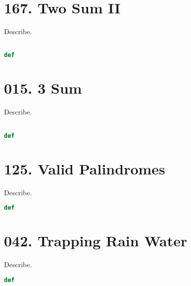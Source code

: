 \documentclass{article}
\begin{document}
\section{167. Two Sum II}
\begin{tcolorbox}[colback=red!5!white, colframe=red!50!black,title=167. Two Sum II ] 
Describe.
\end{tcolorbox}
\begin{lstlisting}[language=Python]

def 

\end{lstlisting}
\section{015. 3 Sum}
\begin{tcolorbox}[colback=red!5!white, colframe=red!50!black,title=015. 3 Sum ] 
Describe.
\end{tcolorbox}
\begin{lstlisting}[language=Python]

def 

\end{lstlisting}
\section{125. Valid Palindromes}
\begin{tcolorbox}[colback=red!5!white, colframe=red!50!black,title=125. Valid Palindromes ] 
Describe.
\end{tcolorbox}
\begin{lstlisting}[language=Python]
def 

\end{lstlisting}
\section{042. Trapping Rain Water}
\begin{tcolorbox}[colback=red!5!white, colframe=red!50!black,title=042. Trapping Rain Water ] 
Describe.
\end{tcolorbox}
\begin{lstlisting}[language=Python]
def 

\end{lstlisting}
\end{document}
